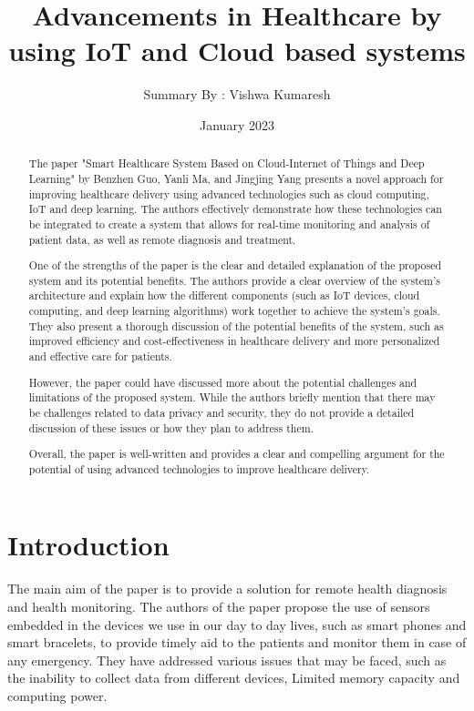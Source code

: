 \documentclass{article}
\begin{document}
\title{Advancements in Healthcare by using IoT and Cloud based systems}
\author{Summary By : Vishwa Kumaresh}
\date{January 2023}

\maketitle
\tableofcontents

\begin{abstract}
The paper "Smart Healthcare System Based on Cloud-Internet of Things and Deep Learning" by Benzhen Guo, Yanli Ma, and Jingjing Yang presents a novel approach for improving healthcare delivery using advanced technologies such as cloud computing, IoT and deep learning. The authors effectively demonstrate how these technologies can be integrated to create a system that allows for real-time monitoring and analysis of patient data, as well as remote diagnosis and treatment.

One of the strengths of the paper is the clear and detailed explanation of the proposed system and its potential benefits. The authors provide a clear overview of the system's architecture and explain how the different components (such as IoT devices, cloud computing, and deep learning algorithms) work together to achieve the system's goals. They also present a thorough discussion of the potential benefits of the system, such as improved efficiency and cost-effectiveness in healthcare delivery and more personalized and effective care for patients.

However, the paper could have discussed more about the potential challenges and limitations of the proposed system. While the authors briefly mention that there may be challenges related to data privacy and security, they do not provide a detailed discussion of these issues or how they plan to address them.

Overall, the paper is well-written and provides a clear and compelling argument for the potential of using advanced technologies to improve healthcare delivery.
\end{abstract}

\section{Introduction}
The main aim of the paper is to provide a solution for remote health diagnosis and health monitoring. The authors of the paper propose the use of sensors embedded in the devices we use in our day to day lives, such as smart phones and smart bracelets, to provide timely aid to the patients and monitor them in case of any emergency. They have addressed various issues that may be faced, such as the inability to collect data from different devices, Limited memory capacity and computing power. 
\end{document}
